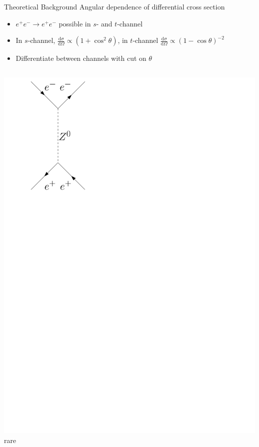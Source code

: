 \documentclass[11pt,xcolor=dvipsnames,professionalfonts]{beamer}
\begin{document}
\begin{frame}{Theoretical Background}
	Angular dependence of differential cross section
	\begin{itemize}
		\item $e^+e^-\rightarrow e^+e^-$ possible in $s$- and $t$-channel
		\item In $s$-channel, $\frac{\mathrm{d}\sigma}{\mathrm{d}\Omega}\propto(1+\cos^2\theta)$, in $t$-channel $\frac{\mathrm{d}\sigma}{\mathrm{d}\Omega}\propto(1-\cos\theta)^{-2}$
		\item Differentiate between channels with cut on $\theta$
	\end{itemize}
	\vspace{.5em}
	\begin{columns}
		\centering
		\includegraphics[width=.8\textwidth]{./figures/theory/feynman/t_z0}\\
		\footnotesize{rare}
		\centering

\end{columns}
\end{frame}
\end{document}

